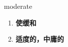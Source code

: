 
\begin{frame}
{\huge moderate}
\begin{center}
\begin{enumerate}\Large
  \item \textbf{使缓和}
  \item \textbf{适度的，中庸的}
\end{enumerate}
\end{center}
\end{frame}

